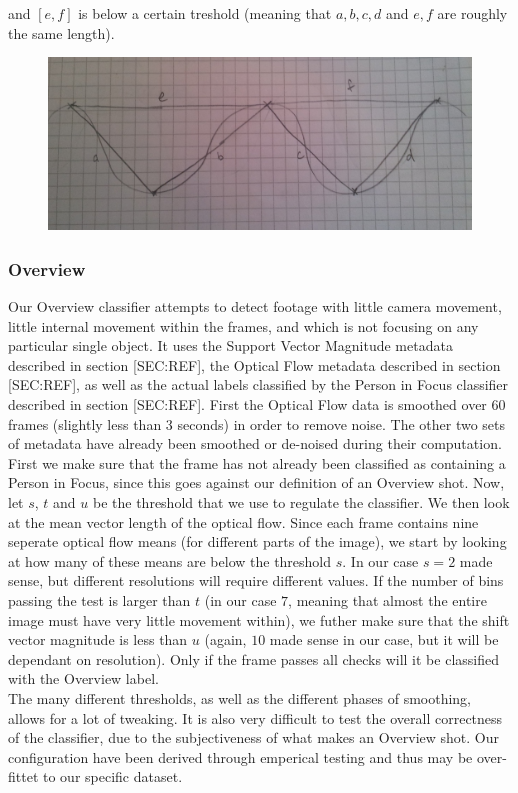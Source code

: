 %
and $[e,f]$ is below a certain treshold (meaning that $a,b,c,d$ and $e,f$ are roughly the same length).
%
\begin{figure}
     \centering
     \includegraphics[width=1.05\textwidth]{img/triangles.jpg}
     \caption{}\label{fig:triangles}
\end{figure}
%
\subsubsection{Overview}
%
%
%
Our Overview classifier attempts to detect footage with little camera movement, little internal movement within the frames, and which is not focusing on any particular single object.
%
%
It uses the Support Vector Magnitude metadata described in section [SEC:REF], the Optical Flow metadata described in section [SEC:REF], as well as the actual labels classified by the Person in Focus classifier described in section [SEC:REF]. First the Optical Flow data is smoothed over 60 frames (slightly less than 3 seconds) in order to remove noise. The other two sets of metadata have already been smoothed or de-noised during their computation.\\
%
%
First we make sure that the frame has not already been classified as containing a Person in Focus, since this goes against our definition of an Overview shot. Now, let $s$, $t$ and $u$ be the threshold that we use to regulate the classifier. We then look at the mean vector length of the optical flow. Since each frame contains nine seperate optical flow means (for different parts of the image), we start by looking at how many of these means are below the threshold $s$. In our case $s=2$ made sense, but different resolutions will require different values. If the number of bins passing the test is larger than $t$ (in our case $7$, meaning that almost the entire image must have very little movement within), we futher make sure that the shift vector magnitude is less than $u$ (again, $10$ made sense in our case, but it will be dependant on resolution).
%
%
Only if the frame passes all checks will it be classified with the Overview label.\\
The many different thresholds, as well as the different phases of smoothing, allows for a lot of tweaking. It is also very difficult to test the overall correctness of the classifier, due to the subjectiveness of what makes an Overview shot. Our configuration have been derived through emperical testing and thus may be over-fittet to our specific dataset.
%
